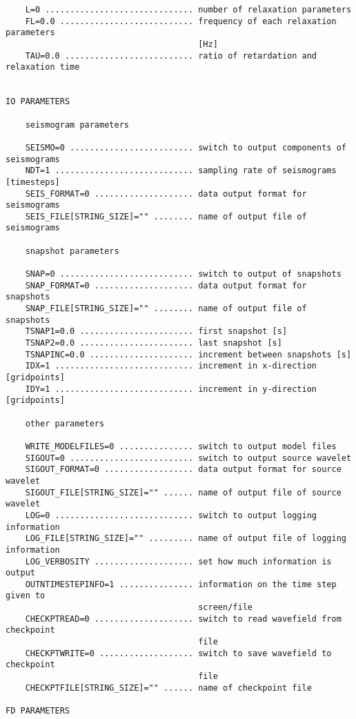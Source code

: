 \begin{verbatim}
    L=0 .............................. number of relaxation parameters
    FL=0.0 ........................... frequency of each relaxation parameters 
                                       [Hz]
    TAU=0.0 .......................... ratio of retardation and relaxation time
    

IO PARAMETERS
    
    seismogram parameters
    
    SEISMO=0 ......................... switch to output components of seismograms
    NDT=1 ............................ sampling rate of seismograms [timesteps]
    SEIS_FORMAT=0 .................... data output format for seismograms
    SEIS_FILE[STRING_SIZE]="" ........ name of output file of seismograms
    
    snapshot parameters
    
    SNAP=0 ........................... switch to output of snapshots
    SNAP_FORMAT=0 .................... data output format for snapshots
    SNAP_FILE[STRING_SIZE]="" ........ name of output file of snapshots
    TSNAP1=0.0 ....................... first snapshot [s]
    TSNAP2=0.0 ....................... last snapshot [s]
    TSNAPINC=0.0 ..................... increment between snapshots [s]
    IDX=1 ............................ increment in x-direction [gridpoints]
    IDY=1 ............................ increment in y-direction [gridpoints]
    
    other parameters
    
    WRITE_MODELFILES=0 ............... switch to output model files
    SIGOUT=0 ......................... switch to output source wavelet
    SIGOUT_FORMAT=0 .................. data output format for source wavelet
    SIGOUT_FILE[STRING_SIZE]="" ...... name of output file of source wavelet
    LOG=0 ............................ switch to output logging information
    LOG_FILE[STRING_SIZE]="" ......... name of output file of logging information
    LOG_VERBOSITY .................... set how much information is output
    OUTNTIMESTEPINFO=1 ............... information on the time step given to
                                       screen/file
    CHECKPTREAD=0 .................... switch to read wavefield from checkpoint 
                                       file
    CHECKPTWRITE=0 ................... switch to save wavefield to checkpoint
                                       file
    CHECKPTFILE[STRING_SIZE]="" ...... name of checkpoint file

FD PARAMETERS
    

\end{verbatim}
